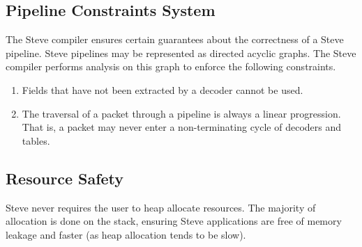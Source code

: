 %
%
%
%
%
%

\subsection{Pipeline Constraints System}

The Steve compiler ensures certain guarantees about the correctness of a Steve
pipeline. Steve pipelines may be represented as directed acyclic graphs. The
Steve compiler performs analysis on this graph to enforce the following
constraints.

\begin{enumerate}
\item Fields that have not been extracted by a decoder cannot be used. 

\item The traversal of a packet through a pipeline is always a linear
progression. That is, a packet may never enter a non-terminating cycle
of decoders and tables.
\end{enumerate}

\subsection{Resource Safety}

Steve never requires the user to heap allocate resources. The majority of
allocation is done on the stack, ensuring Steve applications are free of
memory leakage and faster (as heap allocation tends to be slow).

